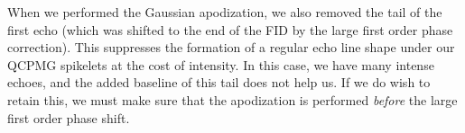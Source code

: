 \documentclass[11pt,a4paper]{article}
\begin{document}
When we performed the Gaussian apodization, we also removed the tail of the first echo (which was shifted to the end of the FID by the large first order phase correction).
This suppresses the formation of a regular echo line shape under our QCPMG spikelets at the cost of intensity.
In this case, we have many intense echoes, and the added baseline of this tail does not help us.
If we do wish to retain this, we must make sure that the apodization is performed \textit{before} the large first order phase shift.
\end{document}
